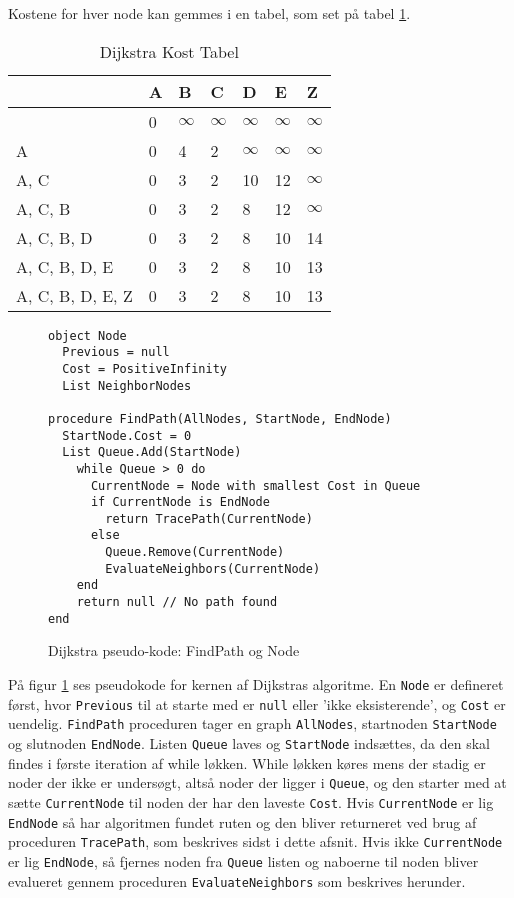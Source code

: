 Kostene for hver node kan gemmes i en tabel, som set på tabel \ref{dijktabel}.
  
\begin{table}[H]
\centering
  \begin{tabular}{|l|l|l|l|l|l|l|}
  \hline
                   & A & B & C & D  & E  & Z  \\ \hline
                   & 0 & $\infty$ & $\infty$ & $\infty$  & $\infty$  & $\infty$  \\ \hline
  A                & 0 & 4 & 2 & $\infty$  & $\infty$  & $\infty$  \\ \hline
  A, C             & 0 & 3 & 2 & 10 & 12 & $\infty$  \\ \hline
  A, C, B          & 0 & 3 & 2 & 8  & 12 & $\infty$  \\ \hline
  A, C, B, D       & 0 & 3 & 2 & 8  & 10 & 14 \\ \hline
  A, C, B, D, E    & 0 & 3 & 2 & 8  & 10 & 13 \\ \hline
  A, C, B, D, E, Z & 0 & 3 & 2 & 8  & 10 & 13 \\ \hline
  \end{tabular}
\caption{Dijkstra Kost Tabel} \label{dijktabel}
\end{table}

\begin{figure}[H]
\begin{lstlisting}
object Node
  Previous = null
  Cost = PositiveInfinity
  List NeighborNodes

procedure FindPath(AllNodes, StartNode, EndNode)
  StartNode.Cost = 0
  List Queue.Add(StartNode)
    while Queue > 0 do
      CurrentNode = Node with smallest Cost in Queue
      if CurrentNode is EndNode
        return TracePath(CurrentNode)
      else
        Queue.Remove(CurrentNode)
        EvaluateNeighbors(CurrentNode)
    end
    return null // No path found
end
\end{lstlisting}
\caption{Dijkstra pseudo-kode: FindPath og Node}\label{DijkstraCodeFindPathNode}
\end{figure}

På figur \ref{DijkstraCodeFindPathNode} ses pseudokode for kernen af Dijkstras algoritme. En \texttt{Node} er defineret først, hvor \texttt{Previous} til at starte med er \texttt{null} eller 'ikke eksisterende', og \texttt{Cost} er uendelig. \texttt{FindPath} proceduren tager en graph \texttt{AllNodes}, startnoden \texttt{StartNode} og slutnoden \texttt{EndNode}. Listen \texttt{Queue} laves og \texttt{StartNode} indsættes, da den skal findes i første iteration af while løkken. While løkken køres mens der stadig er noder der ikke er undersøgt, altså noder der ligger i \texttt{Queue}, og den starter med at sætte \texttt{CurrentNode} til noden der har den laveste \texttt{Cost}. Hvis \texttt{CurrentNode} er lig \texttt{EndNode} så har algoritmen fundet ruten og den bliver returneret ved brug af proceduren \texttt{TracePath}, som beskrives sidst i dette afsnit. Hvis ikke \texttt{CurrentNode} er lig \texttt{EndNode}, så fjernes noden fra \texttt{Queue} listen og naboerne til noden bliver evalueret gennem proceduren \texttt{EvaluateNeighbors} som beskrives herunder.

